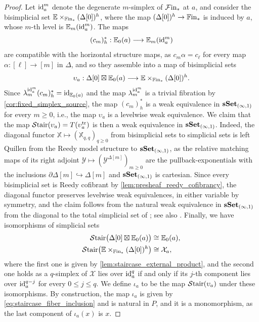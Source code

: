 \documentclass[10pt,reqno]{amsart}
\begin{document}
\begin{proof}
Let $\operatorname{id}_a^m$ denote the degenerate $m$-simplex of $\mathcal{F}\mathrm{in}_*$ at
$a$, and consider the bisimplicial set
$\mathbb E\times_{\mathbb{F}\mathrm{in}_*}(\Delta[0])^h$, where the map
$(\Delta[0])^h\to\mathbb{F}\mathrm{in}_*$ is induced by $a$, whose $m$-th level
is $\mathbb E_m(\operatorname{id}_a^m)$. The maps
\[
 (c_m)_h^*:\mathbb E_0(a)\longrightarrow\mathbb E_m(\operatorname{id}_a^m)
\]
are compatible with the horizontal structure maps, as
$c_m\alpha=c_\ell$ for every map $\alpha:[\ell]\to[m]$ in
$\Delta$, and so they assemble into a map of bisimplicial sets
\[
 \upsilon_a:\Delta[0]\boxtimes\mathbb E_0(a)
 \longrightarrow
 \mathbb E\times_{\mathbb{F}\mathrm{in}_*}(\Delta[0])^h.
\]
Since $\lambda_m^{\operatorname{id}_a^m}(c_m)_h^*=\operatorname{id}_{\mathbb E_0(a)}$ and the
map $\lambda_m^{\operatorname{id}_a^m}$ is a trivial fibration by
\cref{cor:fixed_simplex_source}, the map $(c_m)_h^*$ is a weak
equivalence in $\mathbf{sSet}_{(\infty,1)}$ for every $m\geq0$, i.e., the
map $\upsilon_a$ is a levelwise weak equivalence. We claim that the
map $\mathcal{S}\mathrm{tair}(\upsilon_a)=T(\upsilon_a^{\mathrm{tr}})$ is then a weak
equivalence in $\mathbf{sSet}_{(\infty,1)}$. Indeed, the diagonal functor
$\mathbb X\mapsto(\mathbb X_{q,q})_{q\geq0}$ from bisimplicial sets
to simplicial sets is left Quillen from the Reedy model structure to
$\mathbf{sSet}_{(\infty,1)}$, as the relative matching maps of its right
adjoint $\mathcal Y\mapsto(\mathcal Y^{\Delta[m]})_{m\geq0}$ are the
pullback-exponentials with the inclusions
$\partial\Delta[m]\hookrightarrow\Delta[m]$ and
$\mathbf{sSet}_{(\infty,1)}$ is cartesian. Since every bisimplicial set is
Reedy cofibrant by \cref{lem:presheaf_reedy_cofibrancy}, the diagonal
functor preserves levelwise weak equivalences, in either variable by
symmetry, and the claim follows from the natural weak equivalence in
$\mathbf{sSet}_{(\infty,1)}$ from the diagonal to the total simplicial set
of \cite[Theorem~1.2]{Stevenson2025TotalSimplicialSet}; see also
\cite[Proposition~7.1]{Stevenson2025TotalSimplicialSet}. Finally, we
have isomorphisms of simplicial sets
\[
\begin{aligned}
 \mathcal{S}\mathrm{tair}\bigl(\Delta[0]\boxtimes\mathbb E_0(a)\bigr)
 &\cong\mathbb E_0(a),\\
 \mathcal{S}\mathrm{tair}\bigl(\mathbb E\times_{\mathbb{F}\mathrm{in}_*}(\Delta[0])^h\bigr)
 &\cong\mathcal X_a,
\end{aligned}
\]
where the first one is given by \cref{lem:staircase_external_product},
and the second one holds as a $q$-simplex of $\mathcal X$ lies over
$\operatorname{id}_a^q$ if and only if its $j$-th component lies over
$\operatorname{id}_a^{q-j}$ for every $0\leq j\leq q$. We define $\iota_a$ to
be the map $\mathcal{S}\mathrm{tair}(\upsilon_a)$ under these isomorphisms. By
construction, the map $\iota_a$ is given by
\eqref{eq:staircase_fiber_inclusion} and is natural in $P$, and it
is a monomorphism, as the last component of $\iota_a(x)$ is $x$.
\end{proof}
\end{document}
